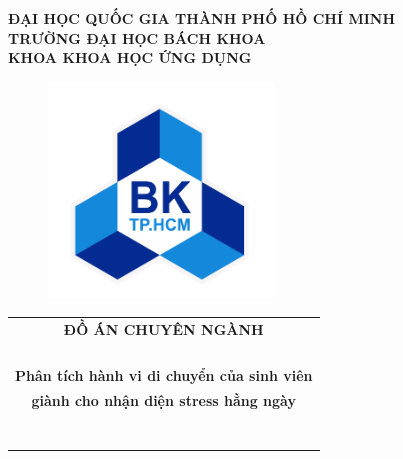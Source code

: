 \documentclass[13pt,a4paper,font=cm]{report}
\author{Hoang Khang PHAN}
\theoremstyle{definition}
\begin{document}
\begin{titlepage}

\begin{center}
\LARGE \textbf{ĐẠI HỌC QUỐC GIA THÀNH PHỐ HỒ CHÍ MINH} \\
\vspace{0.2cm}
\LARGE \textbf{TRƯỜNG ĐẠI HỌC BÁCH KHOA} \\
\vspace{0.2cm}
\LARGE \textbf{KHOA KHOA HỌC ỨNG DỤNG}
\end{center}

\vspace{0.3cm}

\begin{figure}[h!]
\begin{center}
\includegraphics[width=6cm]{Images/hcmut.png}
\end{center}
\end{figure}

\begin{center}
\begin{tabular}{c}
\multicolumn{1}{c}{\textbf{{\LARGE ĐỒ ÁN CHUYÊN NGÀNH}}}\\
\\{\textbf{{\Huge }}}
\\
\\
\\ \textbf{\Huge Phân tích hành vi di chuyển của sinh viên } \\ \textbf{\Huge giành cho nhận diện stress hằng ngày}
\\
\\
\\
\\
\\
\\
\\
\\


\end{tabular}
\end{center}
\end{titlepage}
\end{document}
